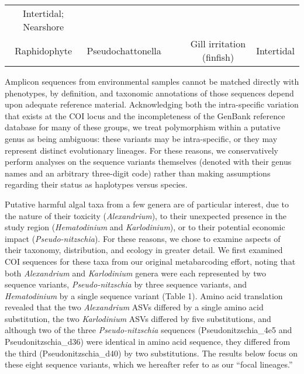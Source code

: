 \documentclass[
]{article}
\begin{document}
\begin{longtable}[]{@{}cccccc@{}}
\begin{minipage}[t]{0.16\columnwidth}
Intertidal; Nearshore\strut
\end{minipage}\tabularnewline
\begin{minipage}[t]{0.11\columnwidth}\centering
Raphidophyte\strut
\end{minipage} & \begin{minipage}[t]{0.13\columnwidth}\centering
Pseudochattonella\strut
\end{minipage} & \begin{minipage}[t]{0.10\columnwidth}\centering
1\strut
\end{minipage} & \begin{minipage}[t]{0.13\columnwidth}\centering
1\strut
\end{minipage} & \begin{minipage}[t]{0.20\columnwidth}\centering
Gill irritation (finfish)\strut
\end{minipage} & \begin{minipage}[t]{0.16\columnwidth}\centering
Intertidal\strut
\end{minipage}\tabularnewline
\bottomrule
\end{longtable}

Amplicon sequences from environmental samples cannot be matched directly
with phenotypes, by definition, and taxonomic annotations of those
sequences depend upon adequate reference material. Acknowledging both
the intra-specific variation that exists at the COI locus and the
incompleteness of the GenBank reference database for many of these
groups, we treat polymorphism within a putative genus as being
ambiguous: these variants may be intra-specific, or they may represent
distinct evolutionary lineages. For these reasons, we conservatively
perform analyses on the sequence variants themselves (denoted with their
genus names and an arbitrary three-digit code) rather than making
assumptions regarding their status as haplotypes versus species.

Putative harmful algal taxa from a few genera are of particular
interest, due to the nature of their toxicity (\emph{Alexandrium}), to
their unexpected presence in the study region (\emph{Hematodinium} and
\emph{Karlodinium}), or to their potential economic impact
(\emph{Pseudo-nitzschia}). For these reasons, we chose to examine
aspects of their taxonomy, distribution, and ecology in greater detail.
We first examined COI sequences for these taxa from our original
metabarcoding effort, noting that both \emph{Alexandrium} and
\emph{Karlodinium} genera were each represented by two sequence
variants, \emph{Pseudo-nitzschia} by three sequence variants, and
\emph{Hematodinium} by a single sequence variant (Table 1). Amino acid
translation revealed that the two \emph{Alexandrium} ASVs differed by a
single amino acid substitution, the two \emph{Karlodinium} ASVs differed
by five substitutions, and although two of the three
\emph{Pseudo-nitzschia} sequences (Pseudonitzschia\_4e5 and
Pseudonitzschia\_d36) were identical in amino acid sequence, they
differed from the third (Pseudonitzschia\_d40) by two substitutions. The
results below focus on these eight sequence variants, which we hereafter
refer to as our ``focal lineages.''
\end{document}
